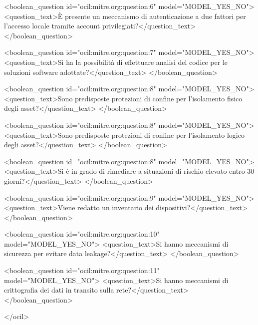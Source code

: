 \begin{xml}
  <boolean_question id="ocil:mitre.org:question:6" model="MODEL_YES_NO">
    <question_text>È presente un meccanismo di autenticazione a due fattori per l'accesso locale tramite account privilegiati?</question_text>
  </boolean_question>

  <boolean_question id="ocil:mitre.org:question:7" model="MODEL_YES_NO">
    <question_text>Si ha la possibilità di effettuare analisi del codice per le soluzioni software adottate?</question_text>
  </boolean_question>

  <boolean_question id="ocil:mitre.org:question:8" model="MODEL_YES_NO">
    <question_text>Sono predisposte protezioni di confine per l'isolamento fisico degli asset?</question_text>
  </boolean_question>

  <boolean_question id="ocil:mitre.org:question:8" model="MODEL_YES_NO">
    <question_text>Sono predisposte protezioni di confine per l'isolamento logico degli asset?</question_text>
  </boolean_question>

  <boolean_question id="ocil:mitre.org:question:8" model="MODEL_YES_NO">
    <question_text>Si è in grado di rimediare a situazioni di rischio elevato entro 30 giorni?</question_text>
  </boolean_question>

  <boolean_question id="ocil:mitre.org:question:9" model="MODEL_YES_NO">
    <question_text>Viene redatto un inventario dei dispositivi?</question_text>
  </boolean_question>

  <boolean_question id="ocil:mitre.org:question:10" model="MODEL_YES_NO">
    <question_text>Si hanno meccanismi di sicurezza per evitare data leakage?</question_text>
  </boolean_question>

  <boolean_question id="ocil:mitre.org:question:11" model="MODEL_YES_NO">
    <question_text>Si hanno meccanismi di crittografia dei dati in transito sulla rete?</question_text>
  </boolean_question>

</ocil>

\end{xml}
\label{appendix:readiness}
